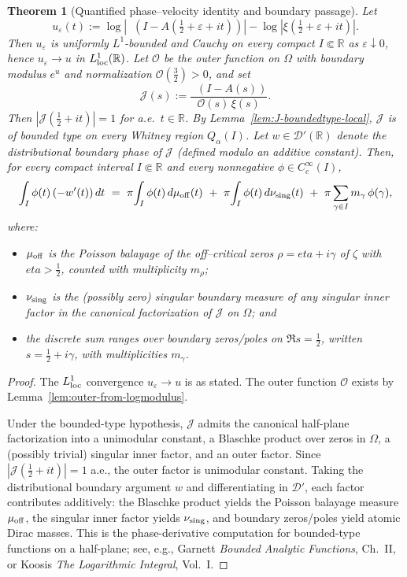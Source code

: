 \documentclass[11pt]{amsart}
\newtheorem{theorem}{Theorem}
\theoremstyle{definition}
\theoremstyle{remark}
\newcommand{\R}{\mathbb{R}}
\DeclareMathOperator{\dettwo}{det_2}
\begin{document}
\begin{theorem}[Quantified phase--velocity identity and boundary passage]\label{thm:phase-velocity-quant}
Let
\[
 u_\varepsilon(t):=\log|\dettwo(I-A(\tfrac12+\varepsilon+it))|-\log|\xi(\tfrac12+\varepsilon+it)|.
\]
Then \(u_\varepsilon\) is uniformly \(L^1\)-bounded and Cauchy on every compact \(I\Subset\R\) as \(\varepsilon\downarrow 0\), hence \(u_\varepsilon\to u\) in \(L^1_{\rm loc}(\R)\).
Let \(\mathcal O\) be the outer function on \(\Omega\) with boundary modulus \(e^{u}\) and normalization \(\mathcal O(\tfrac32)>0\), and set
\[
  \mathcal J(s):=\frac{\dettwo(I-A(s))}{\mathcal O(s)\,\xi(s)}.
\]
Then \(|\mathcal J(\tfrac12+it)|=1\) for a.e.\ \(t\in\R\).
By Lemma~\ref{lem:J-boundedtype-local}, $\mathcal J$ is of bounded type on every Whitney region $Q_{\alpha}(I)$.
Let \(w\in\mathcal D'(\R)\) denote the distributional boundary phase of \(\mathcal J\) (defined modulo an additive constant).
Then, for every compact interval \(I\Subset\R\) and every nonnegative \(\phi\in C_c^\infty(I)\),
\begin{equation}\label{eq:pv-identity}
\int_I \phi(t)\,(-w'(t))\,dt
\ =\ \pi\!\int_I \phi(t)\,d\mu_{\rm off}(t)\ +\ \pi\!\int_I \phi(t)\,d\nu_{\rm sing}(t)\ +\ \pi\sum_{\gamma\in I} m_\gamma\,\phi(\gamma),
\end{equation}
where:
\begin{itemize}
\item \(\mu_{\rm off}\) is the Poisson balayage of the off--critical zeros \(\rho=eta+i\gamma\) of \(\zeta\) with \(eta>\tfrac12\), counted with multiplicity \(m_\rho\);
\item \(\nu_{\rm sing}\) is the (possibly zero) singular boundary measure of any singular inner factor in the canonical factorization of \(\mathcal J\) on \(\Omega\); and
\item the discrete sum ranges over boundary zeros/poles on \(\Re s=\tfrac12\), written \(s=\tfrac12+i\gamma\), with multiplicities \(m_\gamma\).
\end{itemize}
\end{theorem}
\begin{proof}
The \(L^1_{\rm loc}\) convergence \(u_\varepsilon\to u\) is as stated.
The outer function \(\mathcal O\) exists by Lemma~\ref{lem:outer-from-logmodulus}.

Under the bounded-type hypothesis, \(\mathcal J\) admits the canonical half-plane factorization into a unimodular constant, a Blaschke product over zeros in \(\Omega\), a (possibly trivial) singular inner factor, and an outer factor.
Since \(|\mathcal J(\tfrac12+it)|=1\) a.e., the outer factor is unimodular constant.
Taking the distributional boundary argument \(w\) and differentiating in \(\mathcal D'\), each factor contributes additively:
the Blaschke product yields the Poisson balayage measure \(\mu_{\rm off}\), the singular inner factor yields \(\nu_{\rm sing}\), and boundary zeros/poles yield atomic Dirac masses.
This is the phase-derivative computation for bounded-type functions on a half-plane; see, e.g., Garnett \emph{Bounded Analytic Functions}, Ch.~II, or Koosis \emph{The Logarithmic Integral}, Vol.~I.
\end{proof}
\end{document}
